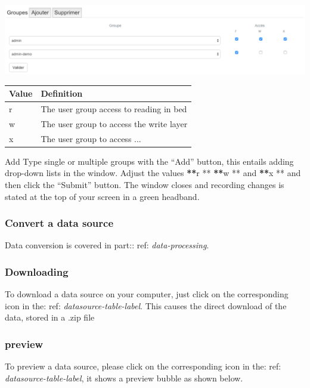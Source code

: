 \documentclass[letterpaper,10pt,english]{sphinxmanual}
\begin{document}
\includegraphics[width=1.000\linewidth]{data-privileges.png}

\begin{tabulary}{\linewidth}{|L|L|}
\hline

\textbf{Value}
 & 
\textbf{Definition}
\\
\hline
r
 & 
The user group access to reading in bed
\\
\hline
w
 & 
The user group to access the write layer
\\
\hline
x
 & 
The user group to access ...
\\
\hline\end{tabulary}


Add Type single or multiple groups with the ``Add'' button, this entails adding drop-down lists in the window. Adjust the values  {\color{red}\bfseries{}**}r ** {\color{red}\bfseries{}**}w **  and  {\color{red}\bfseries{}**}x ** and then click the ``Submit'' button. The window closes and recording changes is stated at the top of your screen in a green headband.


\subsubsection{Convert a data source}
\label{data/datasources:convertir-une-source-de-donnees}
Data conversion is covered in part:: ref: \emph{data-processing}.


\subsubsection{Downloading}
\label{data/datasources:telechargement}
To download a data source on your computer, just click on the corresponding icon in the: ref: \emph{datasource-table-label}. This causes the direct download of the data, stored in a .zip file


\subsubsection{preview}
\label{data/datasources:previsualisation}
To preview a data source, please click on the corresponding icon in the: ref: \emph{datasource-table-label}, it shows a preview bubble as shown below.
\end{document}
